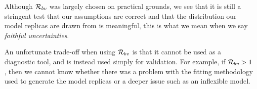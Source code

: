 Although $\mathcal{R}_{bv}$ was largely chosen on practical grounds, we see that it
is still a stringent test that our assumptions are correct and that the
distribution our model replicas are drawn from is meaningful, this is what we
mean when we say {\em faithful uncertainties}.

An unfortunate trade-off when using $\mathcal{R}_{bv}$ is that it cannot be used as
a diagnostic tool, and is instead used simply for validation. For example, if
$\mathcal{R}_{bv} > 1$, then we cannot know whether there was a problem with the
fitting methodology used to generate the model replicas or a deeper issue such
as an inflexible model.
